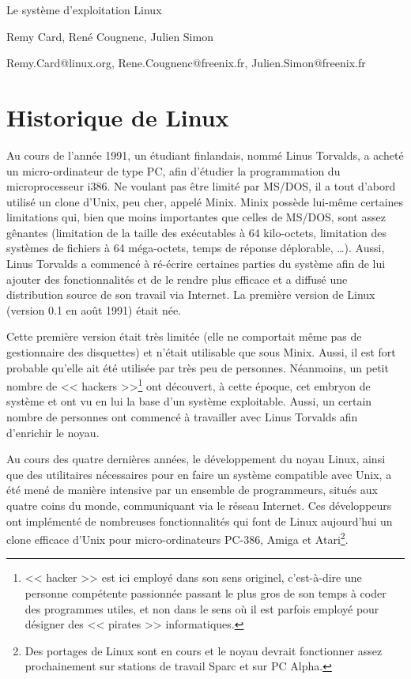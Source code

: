 \documentclass[11pt,a4paper]{article}
\begin{document}
\begin{center}
{
\Large
Le système d'exploitation Linux
}

Remy Card, René Cougnenc, Julien Simon

Remy.Card@linux.org, Rene.Cougnenc@freenix.fr, Julien.Simon@freenix.fr

\end{center}

\section{Historique de Linux}

	Au cours de l'année 1991, un étudiant finlandais, nommé Linus Torvalds,
a acheté un micro-ordinateur de type PC, afin d'étudier la programmation du
microprocesseur i386. Ne voulant pas être limité par MS/DOS, il a tout d'abord
utilisé un clone d'Unix, peu cher, appelé Minix. Minix possède lui-même
certaines limitations qui, bien que moins importantes que celles de MS/DOS,
sont assez gênantes (limitation de la taille des exécutables à 64 kilo-octets,
limitation des systèmes de fichiers à 64 méga-octets, temps de réponse
déplorable, \ldots). Aussi, Linus Torvalds a commencé à ré-écrire certaines
parties du système afin de lui ajouter des fonctionnalités et de le rendre
plus efficace et a diffusé une distribution source de son travail via
Internet. La première version de Linux (version 0.1 en août 1991) était née.

	Cette première version était très limitée (elle ne comportait même pas
de gestionnaire des disquettes) et n'était utilisable que sous Minix. Aussi, il
est fort probable qu'elle ait été utilisée par très peu de personnes.
Néanmoins, un
petit nombre de << hackers >>\footnote{<< hacker >> est ici employé dans son
sens originel, c'est-à-dire une personne compétente passionnée passant le
plus gros de
son temps à coder des programmes utiles, et non dans le sens où il est parfois
employé pour désigner des << pirates >> informatiques.} ont découvert, à cette
époque, cet embryon de système et ont vu en lui la base d'un système
exploitable. Aussi, un certain nombre de personnes ont commencé à travailler
avec Linus Torvalds afin d'enrichir le noyau.

	Au cours des quatre dernières années, le développement du noyau Linux,
ainsi que des utilitaires nécessaires pour en faire un système compatible avec
Unix, a été mené de manière intensive par un ensemble de programmeurs, situés
aux quatre coins du monde, communiquant via le réseau Internet. Ces
développeurs ont implémenté de nombreuses fonctionnalités qui font de Linux
aujourd'hui un clone efficace d'Unix pour micro-ordinateurs PC-386, Amiga
et Atari\footnote{Des portages de Linux sont en cours et le noyau devrait
fonctionner assez prochainement sur stations de travail Sparc et sur PC
Alpha.}.
\end{document}
